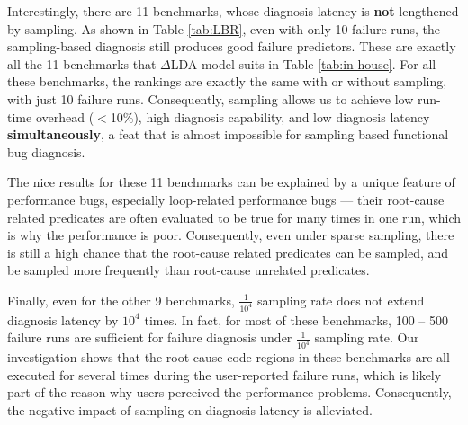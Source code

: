 Interestingly, there are 11 benchmarks, whose diagnosis latency is \textbf{not}
lengthened by sampling. As shown in Table \ref{tab:LBR}, even with only
10 failure runs, the sampling-based diagnosis still produces good failure
predictors. These are exactly all the 11 benchmarks that $\Delta$LDA model 
suits in Table \ref{tab:in-house}. 
For all these benchmarks,
the rankings are exactly the same with or without
sampling, with just 10 failure runs. Consequently, sampling
allows us to achieve low run-time overhead ($<$10\%), high diagnosis capability,
and low diagnosis latency \textbf{simultaneously}, a feat that is almost 
impossible
for sampling based functional bug diagnosis.

The nice results for these 11 benchmarks can be explained by a unique feature
of performance bugs, especially loop-related
performance bugs --- their root-cause related predicates are often evaluated to 
be true for many times in one run, which is why the performance is poor.
Consequently, even under sparse sampling, there is still a high chance that the
root-cause related predicates can be sampled, and be sampled more frequently
than root-cause unrelated predicates.


Finally, even for the other 9 benchmarks, 
$\frac{1}{10^4}$ sampling rate does not 
extend diagnosis
latency by $10^4$ times. In fact, for most of these benchmarks, 100 -- 500
failure runs are sufficient for failure diagnosis under 
$\frac{1}{10^4}$ sampling
rate. Our investigation shows that the root-cause code regions in these 
benchmarks
are all executed for several times during the user-reported failure runs, 
which
is likely part of the reason why users perceived the performance problems. 
Consequently, the negative impact of sampling on diagnosis latency is
alleviated.

